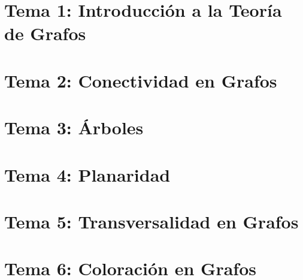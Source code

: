 \renewcommand{\contentsname}{Indice}
\tableofcontents
\newpage
\section{Tema 1: Introducción a la Teoría de Grafos}

\newpage
\section{Tema 2: Conectividad en Grafos}

\newpage
\section{Tema 3: Árboles}

\newpage
\section{Tema 4: Planaridad}

\newpage
\section{Tema 5: Transversalidad en Grafos}

\newpage
\section{Tema 6: Coloración en Grafos}
